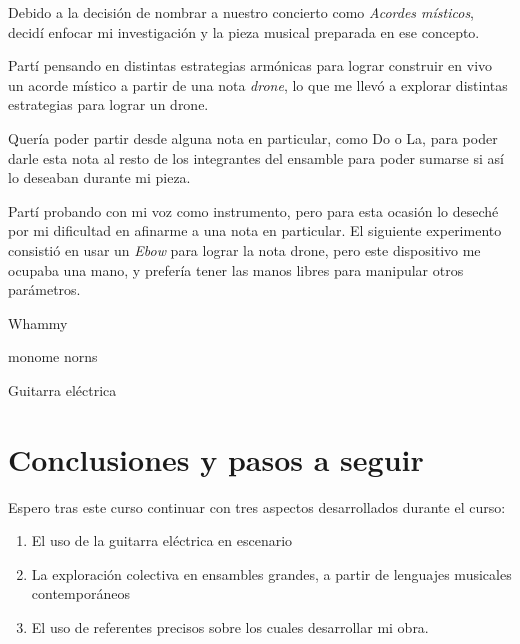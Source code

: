 \documentclass{article}
\begin{document}
Debido a la decisión de nombrar a nuestro concierto como \textit{Acordes místicos}, decidí enfocar mi investigación y la pieza musical preparada en ese concepto.

Partí pensando en distintas estrategias armónicas para lograr construir en vivo un acorde místico a partir de una nota \textit{drone}, lo que me llevó a explorar distintas estrategias para lograr un drone.

Quería poder partir desde alguna nota en particular, como Do o La, para poder darle esta nota al resto de los integrantes del ensamble para poder sumarse si así lo deseaban durante mi pieza.

Partí probando con mi voz como instrumento, pero para esta ocasión lo deseché por mi dificultad en afinarme a una nota en particular. El siguiente experimento consistió en usar un \textit{Ebow} para lograr la nota drone, pero este dispositivo me ocupaba una mano, y prefería tener las manos libres para manipular otros parámetros.



Whammy

monome norns

Guitarra eléctrica



\section{Conclusiones y pasos a seguir}

Espero tras este curso continuar con tres aspectos desarrollados durante el curso:

\begin{enumerate}
    \item El uso de la guitarra eléctrica en escenario
    \item La exploración colectiva en ensambles grandes, a partir de lenguajes musicales contemporáneos
    \item El uso de referentes precisos sobre los cuales desarrollar mi obra.
\end{enumerate}



\clearpage

\printbibliography[title={Bibliografía}, heading=bibintoc]
\end{document}

